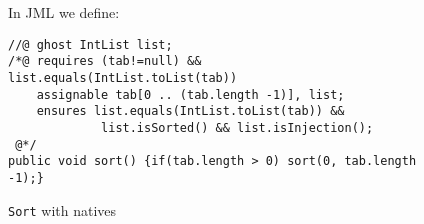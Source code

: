 \begin{figure}[t!]
{\small In JML we define:
\begin{verbatim}
//@ ghost IntList list;
/*@ requires (tab!=null) && list.equals(IntList.toList(tab))
    assignable tab[0 .. (tab.length -1)], list;
    ensures list.equals(IntList.toList(tab)) &&
             list.isSorted() && list.isInjection();
 @*/
public void sort() {if(tab.length > 0) sort(0, tab.length -1);}\end{verbatim}}
\caption{\texttt{Sort} with natives}\label{sortnat} 
\end{figure}




